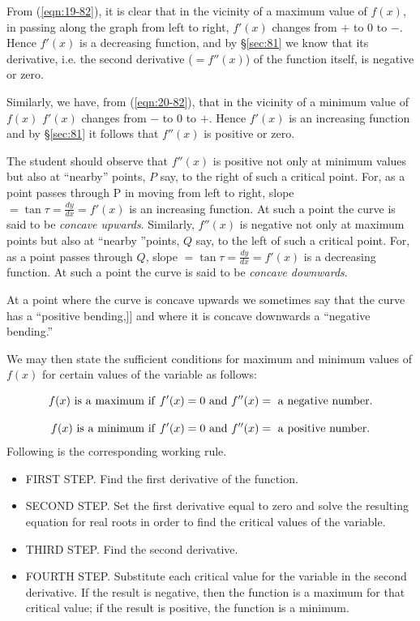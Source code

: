 From (\ref{eqn:19-82}), %
it is clear that in the vicinity of a maximum value of $f(x)$, in 
passing along the graph from left to right,
$f'(x)$ changes from $+$ to $0$ to $-$.
Hence $f'(x)$ is a decreasing function, and by \S \ref{sec:81} %
we know that its derivative, i.e. the second derivative ($= f''(x)$)
of the function itself, is negative or zero.

Similarly, we have, from (\ref{eqn:20-82}), %
that in the vicinity of a minimum value of $f(x)$
$f'(x)$ changes from $-$ to $0$ to $+$.
Hence $f'(x)$ is an increasing function and by \S \ref{sec:81} %
it follows that $f''(x)$ is positive or zero.

The student should observe that $f''(x)$ is positive not only 
at minimum values but also at ``nearby'' points, $P$ say, to
the right of such a critical point. For, as a point 
passes through P in moving from left to right,
slope $= \tan \tau = \frac{dy}{dx} = f'(x)$ is an increasing function.
At such a point the curve is said to be {\it concave upwards}.
Similarly, $f''(x)$ is negative not only at maximum points 
but also at ``nearby ''points, $Q$ say, to the left of such
a critical point. For, as a point passes through $Q$,
slope $= \tan \tau = \frac{dy}{dx} = f'(x)$ is a decreasing function.
At such a point the curve is said to be {\it concave downwards}.

At a point where the curve is concave upwards we sometimes say that 
the curve has a ``positive bending,]] and where it is concave 
downwards a ``negative bending.''

We may then state the sufficient conditions for maximum and minimum 
values of $f(x)$ for certain values of the variable as follows:

\begin{equation}
f(x)\ {\rm is\ a\ maximum\ if\ }f'(x) = 0\ {\rm and}\ f''(x) 
=\ {\rm a\ negative\ number}.
\label{eqn:84-21}
\end{equation}

\begin{equation}
f(x)\ {\rm is\ a\ minimum\ if}\ f'(x) = 0\ {\rm and}\ f''(x) 
=\ {\rm a\ positive\ number}.
\label{eqn:84-22}
\end{equation}
Following is the corresponding working rule.

\begin{itemize}
\item
FIRST STEP. Find the first derivative of the function.

\item
SECOND STEP. Set the first derivative equal to zero and 
solve the resulting equation for real roots in order to find 
the critical values of the variable.

\item
THIRD STEP. Find the second derivative.

\item
FOURTH STEP. Substitute each critical value for the variable in 
the second derivative. If the result is negative, then the 
function is a maximum for that critical value; if the result 
is positive, the function is a minimum.

\end{itemize}


